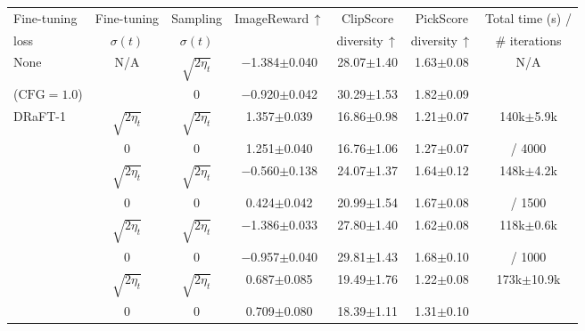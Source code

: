 \begin{table}[h!]
\centering
{\small
\begin{tabular}{lcccccc}
    \toprule
    Fine-tuning & Fine-tuning & Sampling & \multirow{2}{*}{ImageReward$\, \uparrow$} & ClipScore & PickScore & Total time (s) /
    \\
    loss & $\sigma(t)$ & $\sigma(t)$ &  & diversity$\, \uparrow$ & diversity$\, \uparrow$ & \# iterations \\
    \midrule
    None & \multirow{2}{*}{N/A} & $\sqrt{2 \eta_t}$ & $-$1.384{\tiny$\pm$0.040} & 28.07{\tiny$\pm$1.40} & 1.63{\tiny$\pm$0.08} & \multirow{2}{*}{N/A} 
    \\
    ($\mathrm{CFG}=1.0$)                    &                     & 0                 & $-$0.920{\tiny$\pm$0.042} & 30.29{\tiny$\pm$1.53} & 1.82{\tiny$\pm$0.09} \\
    \midrule
    \multirow{2}{*}{DRaFT-1}           & $\sqrt{2 \eta_t}$ & $\sqrt{2 \eta_t}$ & 1.357{\tiny$\pm$0.039} & 16.86{\tiny$\pm$0.98} & 1.21{\tiny$\pm$0.07} 
    & 140k{\tiny$\pm$5.9k}
    \\
                                       & 0                 & 0                 & 1.251{\tiny$\pm$0.040} & 16.76{\tiny$\pm$1.06} & 1.27{\tiny$\pm$0.07} 
    & / 4000 
    \\
    \addlinespace
    \multirow{2}{*}{DRaFT-40}          & $\sqrt{2 \eta_t}$ & $\sqrt{2 \eta_t}$ & $-$0.560{\tiny$\pm$0.138} & 24.07{\tiny$\pm$1.37} & 1.64{\tiny$\pm$0.12} 
    & 148k{\tiny$\pm$4.2k} 
    \\
                                       & 0                 & 0                 & 0.424{\tiny$\pm$0.042} & 20.99{\tiny$\pm$1.54} & 1.67{\tiny$\pm$0.08} 
    & / 1500 
    \\
    \addlinespace
    \multirow{2}{*}{DPO}          & $\sqrt{2 \eta_t}$ & $\sqrt{2 \eta_t}$ & $-$1.386{\tiny$\pm$0.033} & 27.80{\tiny$\pm$1.40} & 1.62{\tiny$\pm$0.08} 
    & 118k{\tiny$\pm$0.6k} 
    \\
                                       & 0                 & 0                 & $-$0.957{\tiny$\pm$0.040} & 29.81{\tiny$\pm$1.43} & 1.68{\tiny$\pm$0.10} 
    & / 1000
    \\
    \addlinespace
    \multirow{2}{*}{ReFL}              & $\sqrt{2 \eta_t}$ & $\sqrt{2 \eta_t}$ & 0.687{\tiny$\pm$0.085} & 19.49{\tiny$\pm$1.76} & 1.22{\tiny$\pm$0.08} 
    & 173k{\tiny$\pm$10.9k}
    \\
                                       & 0                 & 0                 & 0.709{\tiny$\pm$0.080} & 18.39{\tiny$\pm$1.11} & 1.31{\tiny$\pm$0.10} 

\end{tabular}}
\end{table}
